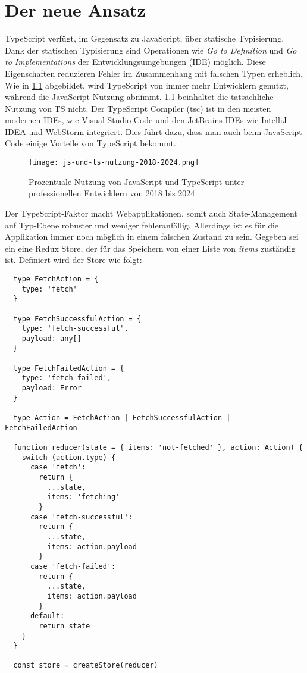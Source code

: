 \chapter{Der neue Ansatz} \label{der-neue-ansatz}

TypeScript verfügt, im Gegensatz zu JavaScript, über statische Typisierung. Dank der statischen Typisierung sind Operationen wie \textit{Go to Definition} und \textit{Go to Implementations} der Entwicklungsumgebungen (IDE) möglich. Diese Eigenschaften reduzieren Fehler im Zusammenhang mit falschen Typen erheblich. Wie in \ref{fig:js-und-ts-nutzung-2018-2024} abgebildet, wird TypeScript von immer mehr Entwicklern genutzt, während die JavaScript Nutzung abnimmt. \ref{fig:js-und-ts-nutzung-2018-2024} beinhaltet die tatsächliche Nutzung von TS nicht. Der TypeScript Compiler (tsc) ist in den meisten modernen IDEs, wie Visual Studio Code und den JetBrains IDEs wie IntelliJ IDEA und WebStorm integriert. Dies führt dazu, dass man auch beim JavaScript Code einige Vorteile von TypeScript bekommt.\cite{typeScriptDocumentary}

\begin{figure}[h!]
  \texttt{[image: js-und-ts-nutzung-2018-2024.png]}
  \caption{Prozentuale Nutzung von JavaScript und TypeScript unter professionellen Entwicklern von 2018 bis 2024}
  \label{fig:js-und-ts-nutzung-2018-2024}
\end{figure}


Der TypeScript-Faktor macht Webapplikationen, somit auch State-Management auf Typ-Ebene robuster und weniger fehleranfällig. Allerdings ist es für die Applikation immer noch möglich in einem falschen Zustand zu sein. Gegeben sei ein eine Redux Store, der für das Speichern von einer Liste von \textit{items} zuständig ist. Definiert wird der Store wie folgt:

\begin{lstlisting}
  type FetchAction = {
    type: 'fetch'
  }

  type FetchSuccessfulAction = {
    type: 'fetch-successful',
    payload: any[]
  }

  type FetchFailedAction = {
    type: 'fetch-failed',
    payload: Error
  }

  type Action = FetchAction | FetchSuccessfulAction | FetchFailedAction

  function reducer(state = { items: 'not-fetched' }, action: Action) {
    switch (action.type) {
      case 'fetch':
        return {
          ...state,
          items: 'fetching'
        }
      case 'fetch-successful':
        return {
          ...state,
          items: action.payload
        }
      case 'fetch-failed':
        return {
          ...state,
          items: action.payload
        }
      default:
        return state
    }
  }
  
  const store = createStore(reducer)
\end{lstlisting}

